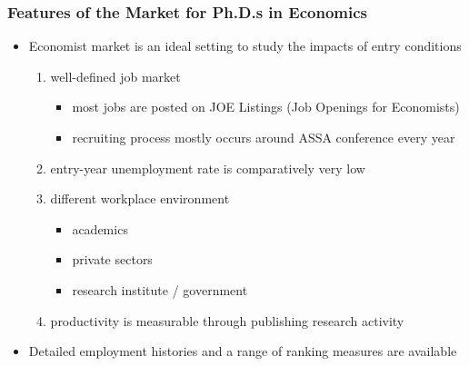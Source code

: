 \documentclass[10pt,svgnames,fragile]{beamer}
\begin{document}
\begin{frame}
	\frametitle{Features of the Market for Ph.D.s in Economics}
	\begin{itemize}
			\item Economist market is an ideal setting to study the impacts of entry conditions 
	\vspace{2 mm}
			\begin{enumerate}
				\item well-defined job market
				\begin{itemize}
						\vspace{1 mm}
					\item most jobs are posted on JOE Listings (Job Openings for Economists)
						\vspace{1 mm}
					\item recruiting process mostly occurs around ASSA conference every year 
				\end{itemize}
	\vspace{1 mm}
				\item entry-year unemployment rate is comparatively very low
		\vspace{2.5 mm}
				\item different workplace environment
					\vspace{1 mm}
				\begin{itemize}
				\item academics
					\vspace{1 mm}
				\item private sectors
					\vspace{1 mm}
				\item research institute / government 
					\vspace{1 mm}
				\end{itemize}
			\vspace{1 mm}
				\item productivity is measurable through publishing research activity
			\end{enumerate}
\vfill
			\item Detailed employment histories and a range of ranking measures are available	
\vfill
	\end{itemize}
\end{frame}
\end{document}
